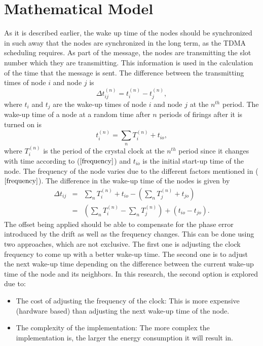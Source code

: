 \documentclass[a4paper,10pt]{report}
\begin{document}
\section{\textbf{Mathematical Model}}
As it is described earlier, the wake up time of the nodes should be synchronized in such away that the nodes are synchronized in the
long term, as the TDMA scheduling requires. As part of the message, the nodes are transmitting the slot number which they are transmitting. This information is used in the calculation of the time that the message is sent.
\newline
The difference between the transmitting times of node $i$ and node $j$ is
\begin{equation}
\Delta t_{ij}^{(n)} = t_i^{(n)} - t_j^{(n)} ,
\end{equation}
where $t_i$ and $t_j$ are the wake-up times of node $i$ and node $j$ at the $n^{th}$ period. The wake-up time of a node at a random time
after $n$ periods of firings after it is turned on is
\begin{equation}
t_i^{(n)} = \sum_{n} T_i^{(n)} + t_{io},
\end{equation}
where  $T_i^{(n)}$ is the period of the crystal clock at the $n^{th}$ period since it changes with time according to
($\ref{frequency}$) and $t_{io}$ is the initial start-up time of the node. The frequency of the node varies due to the different factors
mentioned in ($\ref{frequency}$). \newline
The difference in the wake-up time of the nodes is given by
\begin{eqnarray}
\Delta t_{ij} & = & \sum_{n}T_i^{(n)} + t_{io}- (\sum_{n}T_j^{(n)} +
t_{jo}) \\ &=& (\sum_{n}T_i^{(n)} - \sum_{n}T_j^{(n)}) +
(t_{io}-t_{jo}).
\end{eqnarray}
The offset being applied should be able to compensate for the phase error introduced by the drift as well as the frequency changes. This
can be done using two approaches, which are not exclusive. The first one is adjusting the clock frequency to come up with a better
wake-up time. The second one is to adjust the next wake-up time depending on the difference between the current wake-up time of the
node and its neighbors. In this research, the second option is explored due to:
\begin{itemize}
\item The cost of adjusting the frequency of the clock: This is more expensive (hardware based) than adjusting the next wake-up time of the node.
\item The complexity of the implementation: The more complex the implementation is, the larger the energy consumption it will result in.
\end{itemize}
\end{document}
